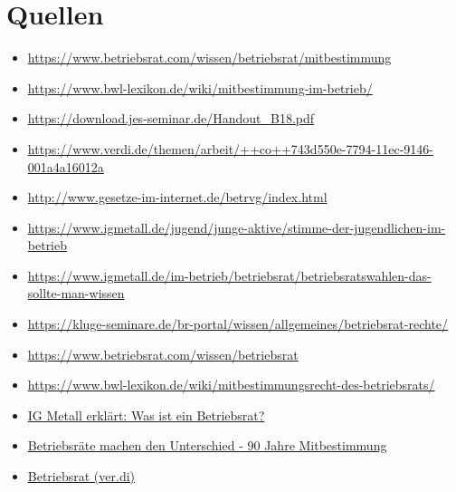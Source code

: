 \documentclass[
  a4paper,            %
  DIV=10,             %
  oneside,            %
  BCOR=5mm,           %
  parskip=half,       %
  numbers=noenddot    %
]{scrartcl}
\begin{document}
\section{Quellen}
   \begin{itemize}
   	\item 
   	\url{https://www.betriebsrat.com/wissen/betriebsrat/mitbestimmung}
   	\item  
   	\url{https://www.bwl-lexikon.de/wiki/mitbestimmung-im-betrieb/}
   	\item
   	\url{https://download.jes-seminar.de/Handout_B18.pdf}
	\item 
	\url{https://www.verdi.de/themen/arbeit/++co++743d550e-7794-11ec-9146-001a4a16012a}
	\item
	\url{http://www.gesetze-im-internet.de/betrvg/index.html} 
	\item 
	\url{https://www.igmetall.de/jugend/junge-aktive/stimme-der-jugendlichen-im-betrieb}
	\item 
	\url{https://www.igmetall.de/im-betrieb/betriebsrat/betriebsratswahlen-das-sollte-man-wissen}
	\item 
	\url{https://kluge-seminare.de/br-portal/wissen/allgemeines/betriebsrat-rechte/}
	\item 
	\url{https://www.betriebsrat.com/wissen/betriebsrat}
	\item 
	\url{https://www.bwl-lexikon.de/wiki/mitbestimmungsrecht-des-betriebsrats/}
	\item 
	\href{https://youtu.be/aPiJ-byyQyU}{IG Metall erklärt: Was ist ein Betriebsrat?}
	\item
	\href{https://youtu.be/7nTdul3NSA4}{Betriebsräte machen den Unterschied - 90 Jahre Mitbestimmung}
	\item
	\href{https://youtu.be/MrKcdzwGqcw}{Betriebsrat (ver.di)}
\end{itemize}

%
%

\clearpage
\end{document}
